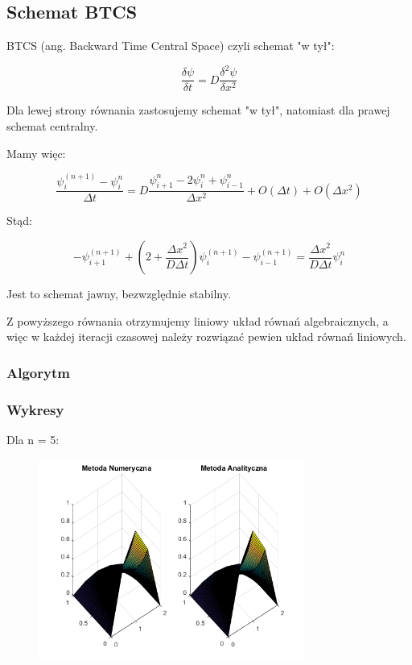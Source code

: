 \newpage
\subsection{Schemat BTCS}
BTCS (ang. Backward Time Central Space) czyli schemat "w tył":

$$\dfrac{\delta \psi}{\delta t} = D\dfrac{\delta^2 \psi}{\delta x^2}$$

Dla lewej strony równania zastosujemy schemat "w tył", natomiast dla prawej schemat centralny.

Mamy więc:

$$\dfrac{\psi^{(n+1)}_{i}-\psi^n_{i}}{\Delta t}=D\dfrac{\psi^{n}_{i+1}-2\psi^n_{i}+\psi^n_{i-1}}{\Delta x^2} + O(\Delta t)+O(\Delta x^2)$$

Stąd:

$$-\psi^{(n+1)}_{i+1} + \left(2+\dfrac{\Delta x^2}{D \Delta t}\right) \psi^{(n+1)}_{i} -\psi^{(n+1)}_{i-1} =\dfrac{\Delta x^2}{D\Delta t}\psi^{n}_{i}$$

Jest to schemat jawny, bezwzględnie stabilny. 

Z powyższego równania otrzymujemy liniowy układ równań algebraicznych, a więc w każdej iteracji czasowej należy rozwiązać pewien układ równań liniowych.
\newpage
\subsubsection{Algorytm}

\newpage
\subsubsection{Wykresy}

Dla n = 5:

\begin{figure}[!ht]
	\begin{center}
		\includegraphics[width=0.78\textwidth]{Lab7/charts/btcs/5.png}
	\end{center}
\end{figure}

